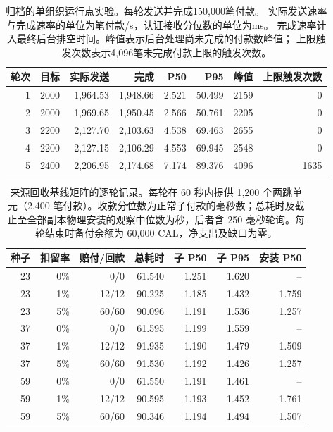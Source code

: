 \begin{table}[!ht]
\centering\small
\caption{归档的单组织运行点实验。每轮发送并完成150,000笔付款。
实际发送速率与完成速率的单位为笔付款/s，认证接收分位数的单位为ms。
完成速率计入最终后台排空时间。峰值表示后台处理尚未完成的付款数峰值；
上限触发次数表示4,096笔未完成付款上限的触发次数。}
\label{tab:supp-throughput}
\begin{tabular}{@{}rrrrrrrr@{}}
\toprule
轮次 & 目标 & 实际发送 & 完成 & P50 & P95 & 峰值 & 上限触发次数 \\
\midrule
1 & 2000 & 1,964.53 & 1,948.66 & 2.521 & 50.499 & 2159 & 0 \\
2 & 2000 & 1,969.65 & 1,950.45 & 2.566 & 50.761 & 2205 & 0 \\
3 & 2200 & 2,127.70 & 2,103.63 & 4.538 & 69.463 & 2655 & 0 \\
4 & 2200 & 2,127.15 & 2,106.29 & 4.553 & 69.945 & 2548 & 0 \\
5 & 2400 & 2,206.95 & 2,174.68 & 7.174 & 89.376 & 4096 & 1635 \\
\bottomrule
\end{tabular}
\end{table}
\begin{table}[!ht]
\centering\small
\caption{来源回收基线矩阵的逐轮记录。每轮在 60 秒内提供 1,200 个两跳单元（2,400 笔付款）。收款分位数为正常子付款的毫秒数；总耗时及截止至全部副本物理安装的观察中位数为秒，后者含 250 毫秒轮询。每轮结束时备付余额为 60,000 CAL，净支出及缺口为零。}
\label{tab:supp-liability}
\begin{tabular}{@{}rrrrrrr@{}}
\toprule
种子 & 扣留率 & 赔付/回款 & 总耗时 & 子 P50 & 子 P95 & 安装 P50 \\
\midrule
23 & 0\% & 0/0 & 61.540 & 1.251 & 1.620 & -- \\
23 & 1\% & 12/12 & 90.225 & 1.185 & 1.432 & 1.759 \\
23 & 5\% & 60/60 & 90.096 & 1.191 & 1.536 & 1.257 \\
37 & 0\% & 0/0 & 61.595 & 1.199 & 1.559 & -- \\
37 & 1\% & 12/12 & 91.935 & 1.190 & 1.479 & 1.509 \\
37 & 5\% & 60/60 & 91.530 & 1.192 & 1.426 & 1.257 \\
59 & 0\% & 0/0 & 61.550 & 1.191 & 1.461 & -- \\
59 & 1\% & 12/12 & 90.595 & 1.193 & 1.452 & 1.761 \\
59 & 5\% & 60/60 & 90.346 & 1.194 & 1.494 & 1.507 \\
\bottomrule
\end{tabular}
\end{table}
